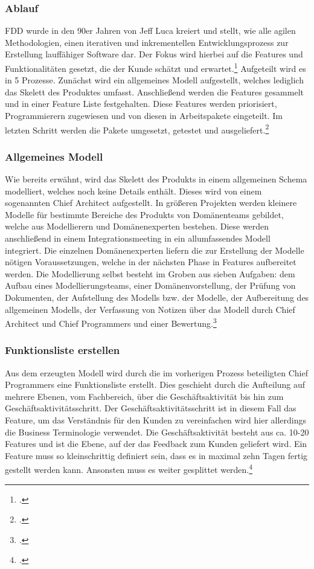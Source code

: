 \subsubsection{Ablauf}
FDD wurde in den 90er Jahren von Jeff Luca kreiert und stellt, wie alle agilen Methodologien, einen iterativen und inkrementellen Entwicklungsprozess zur Erstellung lauffähiger Software dar. Der Fokus wird hierbei auf die Features und Funktionalitäten gesetzt, die der Kunde schätzt und erwartet.\footcite[Vgl.][]{internet2} Aufgeteilt wird es in 5 Prozesse. Zunächst wird ein allgemeines Modell aufgestellt, welches lediglich das Skelett des Produktes umfasst. Anschließend werden die Features gesammelt und in einer Feature Liste festgehalten. Diese Features werden priorisiert, Programmierern zugewiesen und von diesen in Arbeitspakete eingeteilt. Im letzten Schritt werden die Pakete umgesetzt, getestet und ausgeliefert.\footcite[Vgl.][Seite 274-278]{highsmith}

\subsubsection{Allgemeines Modell}
Wie bereits erwähnt, wird das Skelett des Produkts in einem allgemeinen Schema modelliert, welches noch keine Details enthält. Dieses wird von einem sogenannten Chief Architect aufgestellt. In größeren Projekten werden kleinere Modelle für bestimmte Bereiche des Produkts von Domänenteams gebildet, welche aus Modellierern und Domänenexperten bestehen. Diese werden anschließend in einem Integrationsmeeting in ein allumfassendes Modell integriert. Die einzelnen Domänenexperten liefern die zur Erstellung der Modelle nötigen Voraussetzungen, welche in der nächsten Phase in Features aufbereitet werden. Die Modellierung selbst besteht im Groben aus sieben Aufgaben: dem Aufbau eines Modellierungsteams, einer Domänenvorstellung, der Prüfung von Dokumenten, der Aufstellung des Modells bzw. der Modelle, der Aufbereitung des allgemeinen Modells, der Verfassung von Notizen über das Modell durch Chief Architect und Chief Programmers und einer Bewertung.\footcite[Vgl.][Seite 274 f.]{highsmith}

\subsubsection{Funktionsliste erstellen}
Aus dem erzeugten Modell wird durch die im vorherigen Prozess beteiligten Chief Programmers eine Funktionsliste erstellt. Dies geschieht durch die Aufteilung auf mehrere Ebenen, vom Fachbereich, über die Geschäftsaktivität bis hin zum Geschäftsaktivitätsschritt. Der Geschäftsaktivitätsschritt ist in diesem Fall das Feature, um das Verständnis für den Kunden zu vereinfachen wird hier allerdings die Business Terminologie verwendet. Die Geschäftsaktivität besteht aus ca. 10-20 Features und ist die Ebene, auf der das Feedback zum Kunden geliefert wird. Ein Feature muss so kleinschrittig definiert sein, dass es in maximal zehn Tagen fertig gestellt werden kann. Ansonsten muss es weiter gesplittet werden.\footcite[Vgl.][Seite 275 f.]{highsmith}

